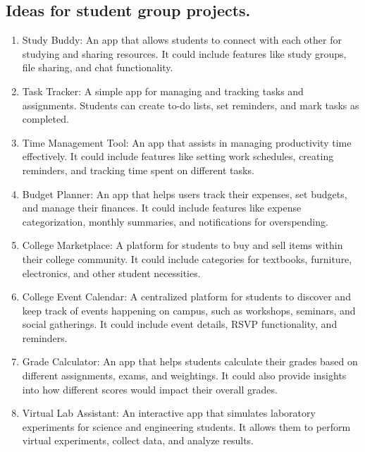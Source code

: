 \documentclass[a4paper,12pt]{article}
\begin{document}

\begin{large}

\section*{Ideas for student group projects.}

\begin{enumerate}

\item Study Buddy: An app that allows students to connect with each other for studying and sharing resources. It could include features like study groups, file sharing, and chat functionality.
    
\item Task Tracker: A simple app for managing and tracking tasks and assignments. Students can create to-do lists, set reminders, and mark tasks as completed.

\item Time Management Tool: An app that assists in managing productivity time effectively. It could include features like setting work schedules, creating reminders, and tracking time spent on different tasks.

\item Budget Planner: An app that helps users track their expenses, set budgets, and manage their finances. It could include features like expense categorization, monthly summaries, and notifications for overspending.

\item College Marketplace: A platform for students to buy and sell items within their college community. It could include categories for textbooks, furniture, electronics, and other student necessities.

\item College Event Calendar: A centralized platform for students to discover and keep track of events happening on campus, such as workshops, seminars, and social gatherings. It could include event details, RSVP functionality, and reminders.

\item Grade Calculator: An app that helps students calculate their grades based on different assignments, exams, and weightings. It could also provide insights into how different scores would impact their overall grades.

\item Virtual Lab Assistant: An interactive app that simulates laboratory experiments for science and engineering students. It allows them to perform virtual experiments, collect data, and analyze results.


\end{enumerate}
\end{large}
\end{document}
